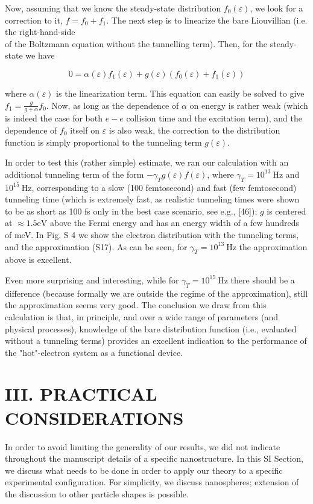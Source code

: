\documentclass[10pt]{article}
\begin{document}
Now, assuming that we know the steady-state distribution $f_{0}(\varepsilon)$, we look for a correction to it, $f=f_{0}+f_{1}$. The next step is to linearize the bare Liouvillian (i.e. the right-hand-side\\
of the Boltzmann equation without the tunnelling term). Then, for the steady-state we have


\begin{equation*}
0=\alpha(\varepsilon) f_{1}(\varepsilon)+g(\varepsilon)\left(f_{0}(\varepsilon)+f_{1}(\varepsilon)\right) \tag{S17}
\end{equation*}


where $\alpha(\varepsilon)$ is the linearization term. This equation can easily be solved to give $f_{1}=\frac{g}{g+\alpha} f_{0}$. Now, as long as the dependence of $\alpha$ on energy is rather weak (which is indeed the case for both $e-e$ collision time and the excitation term), and the dependence of $f_{0}$ itself on $\varepsilon$ is also weak, the correction to the distribution function is simply proportional to the tunneling term $g(\varepsilon)$.

In order to test this (rather simple) estimate, we ran our calculation with an additional tunneling term of the form $-\gamma_{T} g(\varepsilon) f(\varepsilon)$, where $\gamma_{T}=10^{13} \mathrm{~Hz}$ and $10^{15} \mathrm{~Hz}$, corresponding to a slow (100 femtosecond) and fast (few femtosecond) tunneling time (which is extremely fast, as realistic tunneling times were shown to be as short as 100 fs only in the best case scenario, see e.g., [46]); $g$ is centered at $\approx 1.5 \mathrm{eV}$ above the Fermi energy and has an energy width of a few hundreds of meV. In Fig. S 4 we show the electron distribution with the tunneling terms, and the approximation (S17). As can be seen, for $\gamma_{T}=10^{13} \mathrm{~Hz}$ the approximation above is excellent.

Even more surprising and interesting, while for $\gamma_{T}=10^{15} \mathrm{~Hz}$ there should be a difference (because formally we are outside the regime of the approximation), still the approximation seems very good. The conclusion we draw from this calculation is that, in principle, and over a wide range of parameters (and physical processes), knowledge of the bare distribution function (i.e., evaluated without a tunneling terms) provides an excellent indication to the performance of the "hot"-electron system as a functional device.

\section*{III. PRACTICAL CONSIDERATIONS}
In order to avoid limiting the generality of our results, we did not indicate throughout the manuscript details of a specific nanostructure. In this SI Section, we discuss what needs to be done in order to apply our theory to a specific experimental configuration. For simplicity, we discuss nanospheres; extension of the discussion to other particle shapes is possible.
\end{document}
